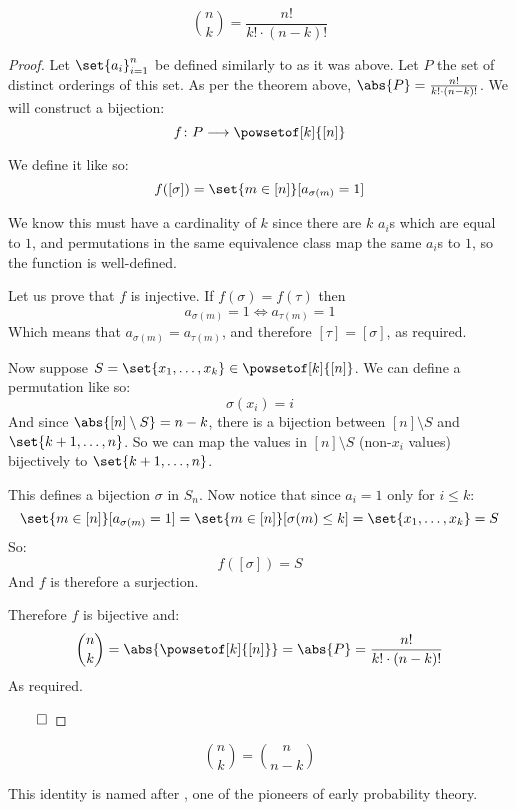 \begin{coro*}[binomialIntro]

	\[ \binom{n}{k} = \frac{n!}{k!\cdot(n-k)!} \]

\end{coro*}

\begin{proof}

	Let $\set{a_i}_{i=1}^n$ be defined similarly to as it was above. Let $P$ the set of distinct orderings of this set.
	As per the theorem above, $\abs{P}=\frac{n!}{k!\cdot(n-k)!}$. We will construct a bijection:
	\[ f\colon P\longrightarrow\powsetof[k]{[n]} \]

	We define it like so:
	\[ f([\sigma]) = \set{m\in[n]}[a_{\sigma(m)}=1] \]

	We know this must have a cardinality of $k$ since there are $k$ $a_i$s which are equal to $1$, and permutations in the
	same equivalence class map the same $a_i$s to $1$, so the function is well-defined.

	Let us prove that $f$ is injective. If $f(\sigma)=f(\tau)$ then
	\[ a_{\sigma(m)} = 1 \iff a_{\tau(m)} = 1 \]
	Which means that $a_{\sigma(m)}=a_{\tau(m)}$, and therefore $[\tau]=[\sigma]$, as required.

	Now suppose $S=\set{x_1,\dots,x_k}\in\powsetof[k]{[n]}$. We can define a permutation like so:
	\[ \sigma(x_i) = i \]
	And since $\abs{[n]\setminus S}=n-k$, there is a bijection between $[n]\setminus S$ and $\set{k+1,\dots,n}$. So we can
	map the values in $[n]\setminus S$ (non-$x_i$ values) bijectively to $\set{k+1,\dots,n}$.

	This defines a bijection $\sigma$ in $S_n$. Now notice that since $a_i=1$ only for $i\leq k$:
	\[ \set{m\in[n]}[a_{\sigma(m)}=1] = \set{m\in[n]}[\sigma(m)\leq k] = \set{x_1,\dots,x_k} = S \]
	So:
	\[ f([\sigma]) = S \]
	And $f$ is therefore a surjection.

	Therefore $f$ is bijective and:
	\[ \binom{n}{k} = \abs{\powsetof[k]{[n]}} = \abs{P} = \frac{n!}{k!\cdot(n-k)!} \]
	As required.

	\hfill$\qed$

\end{proof}

\newpage
\begin{prop}

	\[ \binom{n}{k} = \binom{n}{n-k} \]

	This identity is named after , one of the pioneers of early probability theory.

\end{prop}

